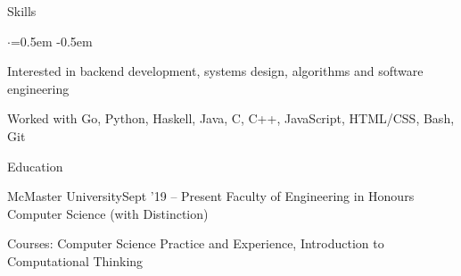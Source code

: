 \documentclass{resume} %
\begin{document}

\begin{rSection}{Skills}
  \vspace {0.2em}
  \begin{list}{$\cdot$}{\leftmargin=0.5em}
    \itemsep -0.5em \vspace{-0.3em}
    \item Interested in backend development, systems design, algorithms and
      software engineering
    \item Worked with Go, Python, Haskell, Java, C, C++, JavaScript, HTML/CSS, Bash,
      Git
  \end{list}
  \vspace{0.1em}
\end{rSection}


\begin{rSection}{Education}
  \begin{rSubsection}{McMaster University}{Sept '19 -- Present}
                     {Faculty of Engineering in Honours Computer Science (with Distinction)}{}
      \item Courses: Computer Science Practice and Experience, Introduction to Computational Thinking
  \end{rSubsection}
\end{rSection}

\end{document}
